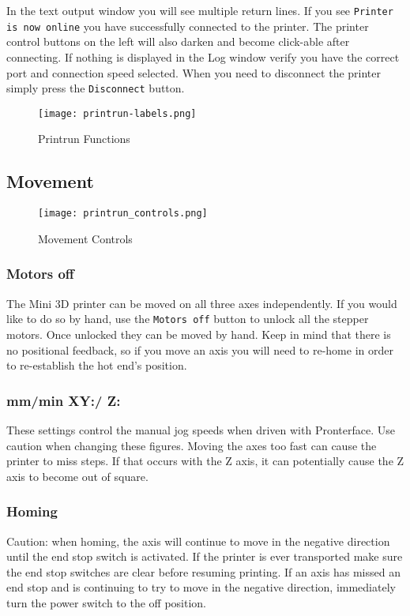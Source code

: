 In the text output window you will see multiple return lines. If you see \texttt{Printer is now online} you have successfully connected to the printer. The printer control buttons on the left will also darken and become click-able after connecting. If nothing is displayed in the Log window verify you have the correct port and connection speed selected. When you need to disconnect the printer simply press the \texttt{Disconnect} button.

\begin{figure}[H]
\centering
\texttt{[image: printrun-labels.png]}
\caption{Printrun Functions}
\label{fig:Printrun-labels}
\end{figure}

\subsection{Movement} 
\begin{figure}[H]
\centering
\texttt{[image: printrun\_controls.png]}
\caption{Movement Controls}
\label{fig:Printrun_controls}
\end{figure}

\subsubsection{Motors off}
The Mini 3D printer can be moved on all three axes independently. If you would like to do so by hand, use the \texttt{Motors off} button to unlock all the stepper motors. Once unlocked they can be moved by hand. Keep in mind that there is no positional feedback, so if you move an axis you will need to re-home in order to re-establish the hot end's position. 

\subsubsection{mm/min XY:/ Z:}
These settings control the manual jog speeds when driven with Pronterface. Use caution when changing these figures. Moving the axes too fast can cause the printer to miss steps. If that occurs with the Z axis, it can potentially cause the Z axis to become out of square.

\subsubsection{Homing}
Caution: when homing, the axis will continue to move in the negative direction until the end stop switch is activated. If the printer is ever transported make sure the end stop switches are clear before resuming printing. If an axis has missed an end stop and is continuing to try to move in the negative direction, immediately turn the power switch to the off position. 

